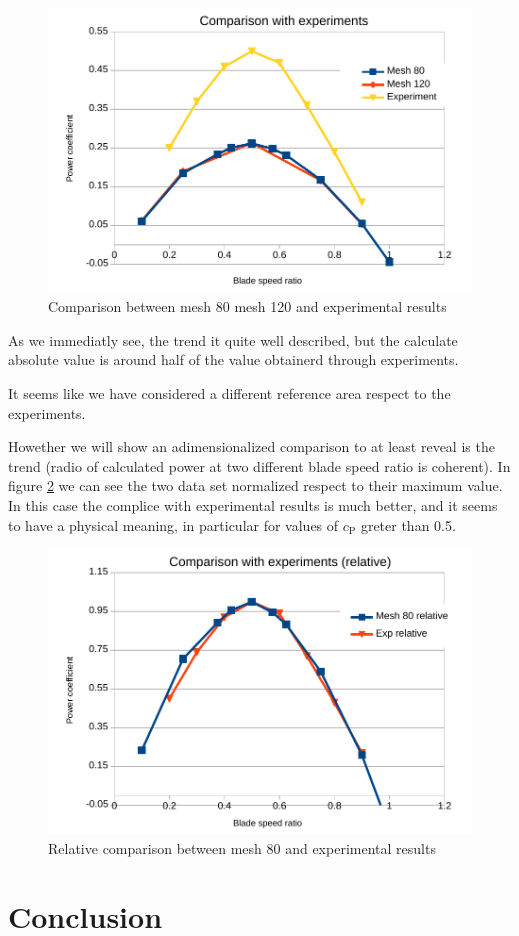 \documentclass[a4paper,12pt]{article}
\begin{document}
\begin{figure}[hbtp]
\centering
\includegraphics[width=15cm]{images/bsr/bsr-exp.pdf}
\caption{Comparison between mesh 80 mesh 120 and experimental results}
\label{fig:bsr-comparison-exp}
\end{figure}

As we immediatly see, the trend it quite well described, but the calculate absolute value is around half of the value obtainerd through experiments.

It seems like we have considered a different reference area respect to the experiments.

Howether we will show an adimensionalized comparison to at least reveal is the trend (radio of calculated power at two different blade speed ratio is coherent).
In figure \ref{fig:bsr-comparison-exp-relative} we can see the two data set normalized respect to their maximum value.
In this case the complice with experimental results is much better, and it seems to have a physical meaning, in particular for values of $c_\text{P}$ greter than 0.5.

\begin{figure}[hbtp]
\centering
\includegraphics[width=15cm]{images/bsr/bsr-exp-relative.pdf}
\caption{Relative comparison between mesh 80 and experimental results}
\label{fig:bsr-comparison-exp-relative}
\end{figure}

\section{Conclusion}
\end{document}
